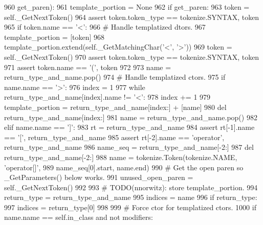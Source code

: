 \begin{DoxyCode}
960                    get\_paren):
961         template\_portion = \textcolor{keywordtype}{None}
962         \textcolor{keywordflow}{if} get\_paren:
963             token = self.\_GetNextToken()
964             \textcolor{keyword}{assert} token.token\_type == tokenize.SYNTAX, token
965             \textcolor{keywordflow}{if} token.name == \textcolor{stringliteral}{'<'}:
966                 \textcolor{comment}{# Handle templatized dtors.}
967                 template\_portion = [token]
968                 template\_portion.extend(self.\_GetMatchingChar(\textcolor{stringliteral}{'<'}, \textcolor{stringliteral}{'>'}))
969                 token = self.\_GetNextToken()
970             \textcolor{keyword}{assert} token.token\_type == tokenize.SYNTAX, token
971             \textcolor{keyword}{assert} token.name == \textcolor{stringliteral}{'('}, token
972 
973         name = return\_type\_and\_name.pop()
974         \textcolor{comment}{# Handle templatized ctors.}
975         \textcolor{keywordflow}{if} name.name == \textcolor{stringliteral}{'>'}:
976             index = 1
977             \textcolor{keywordflow}{while} return\_type\_and\_name[index].name != \textcolor{stringliteral}{'<'}:
978                 index += 1
979             template\_portion = return\_type\_and\_name[index:] + [name]
980             del return\_type\_and\_name[index:]
981             name = return\_type\_and\_name.pop()
982         \textcolor{keywordflow}{elif} name.name == \textcolor{stringliteral}{']'}:
983             rt = return\_type\_and\_name
984             \textcolor{keyword}{assert} rt[-1].name == \textcolor{stringliteral}{'['}, return\_type\_and\_name
985             \textcolor{keyword}{assert} rt[-2].name == \textcolor{stringliteral}{'operator'}, return\_type\_and\_name
986             name\_seq = return\_type\_and\_name[-2:]
987             del return\_type\_and\_name[-2:]
988             name = tokenize.Token(tokenize.NAME, \textcolor{stringliteral}{'operator[]'},
989                                   name\_seq[0].start, name.end)
990             \textcolor{comment}{# Get the open paren so \_GetParameters() below works.}
991             unused\_open\_paren = self.\_GetNextToken()
992 
993         \textcolor{comment}{# TODO(nnorwitz): store template\_portion.}
994         return\_type = return\_type\_and\_name
995         indices = name
996         \textcolor{keywordflow}{if} return\_type:
997             indices = return\_type[0]
998 
999         \textcolor{comment}{# Force ctor for templatized ctors.}
1000         \textcolor{keywordflow}{if} name.name == self.in\_class \textcolor{keywordflow}{and} \textcolor{keywordflow}{not} modifiers:

\end{DoxyCode}
